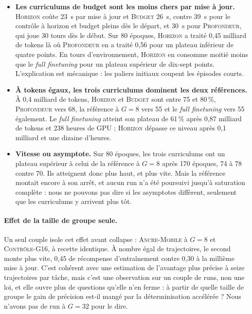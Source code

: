 \documentclass[11pt,a4paper]{article}
\begin{document}
\begin{itemize}
    \item \textbf{Les curriculums de budget sont les moins chers par mise à jour.} \textsc{Horizon} coûte 23~s par mise à jour et \textsc{Budget} 26~s, contre 39~s pour le contrôle à horizon et budget pleins dès le départ, et 30~s pour \textsc{Profondeur}, qui joue 30 tours dès le début. Sur 80 époques, \textsc{Horizon} a traité 0{,}45 milliard de tokens là où \textsc{Profondeur} en a traité 0{,}56 pour un plateau inférieur de quatre points. En tours d'environnement, \textsc{Horizon} en consomme moitié moins que le \emph{full finetuning} pour un plateau supérieur de dix-sept points. L'explication est mécanique : les paliers initiaux coupent les épisodes courts.
    \item \textbf{À tokens égaux, les trois curriculums dominent les deux références.} À 0{,}4 milliard de tokens, \textsc{Horizon} et \textsc{Budget} sont entre 75 et 80\,\%, \textsc{Profondeur} vers 68, la référence à $G=8$ vers 55 et le \emph{full finetuning} vers 55 également. Le \emph{full finetuning} atteint son plateau de 61\,\% après 0{,}87 milliard de tokens et 238 heures de GPU ; \textsc{Horizon} dépasse ce niveau après 0{,}1 milliard et une dizaine d'heures.
    \item \textbf{Vitesse ou asymptote.} Sur 80 époques, les trois curriculums ont un plateau supérieur à celui de la référence à $G=8$ après 170 époques, 74 à 78 contre 70. Ils atteignent donc plus haut, et plus vite. Mais la référence montait encore à son arrêt, et aucun run n'a été poursuivi jusqu'à saturation complète : nous ne pouvons pas dire si les asymptotes diffèrent, seulement que les curriculums y arrivent plus tôt.
\end{itemize}

\paragraph{Effet de la taille de groupe seule.} Un seul couple isole cet effet avant collapse : \textsc{Ancre-Mobile} à $G=8$ et \textsc{Contrôle-G16}, à recette identique. À nombre égal de trajectoires, le second monte plus vite, 0{,}45 de récompense d'entraînement contre 0{,}30 à la millième mise à jour. C'est cohérent avec une estimation de l'avantage plus précise à seize trajectoires par tâche, mais c'est une observation sur un couple de runs, non une loi, et elle ouvre plus de questions qu'elle n'en ferme : à partir de quelle taille de groupe le gain de précision est-il mangé par la déterminisation accélérée ? Nous n'avons pas de run à $G=32$ pour le dire.
\end{document}
